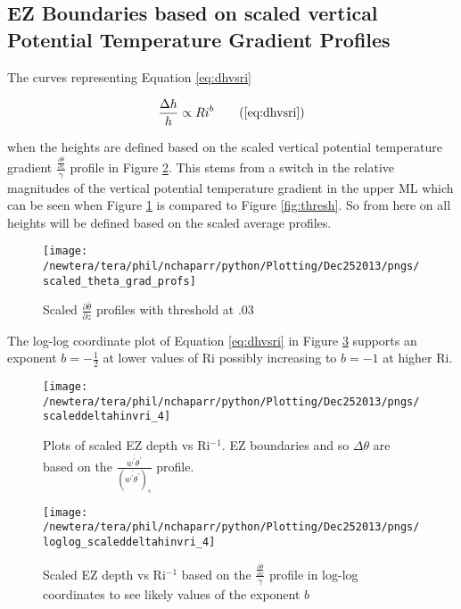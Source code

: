 \clearpage
\subsection{\acs{EZ} Boundaries based on scaled vertical Potential Temperature Gradient Profiles}
\label{subsec:ellimscaledprof}

The curves representing Equation \ref{eq:dhvsri} 

\begin{equation}
\frac{\Delta h}{h} \propto Ri ^{b} \tag{\ref{eq:dhvsri}}
\end{equation}

when the heights are defined based on the scaled vertical potential temperature gradient 
$\frac{\frac{\partial \overline{\theta}}{\partial z}}{\gamma}$ profile in Figure \ref{fig:deltahinvri_scaled}.  This stems
from a switch in the relative magnitudes of the vertical potential temperature gradient in the upper \acs{ML} which can be seen when Figure \ref{fig:thresh3} is compared to Figure \ref{fig:thresh}. So from here on all heights will be defined based on the scaled average profiles.   
\\

\begin{figure}[htbp]
    \centering
    \texttt{[image: /newtera/tera/phil/nchaparr/python/Plotting/Dec252013/pngs/scaled\_theta\_grad\_profs]}
    \caption{Scaled $\frac{\partial \overline{\theta}}{\partial z}$ profiles with threshold at .03}
    \label{fig:thresh3}   %
\end{figure}

The log-log coordinate plot of Equation \ref{eq:dhvsri} in Figure \ref{fig:loglogdeltahinvri} supports an exponent $b = -\frac{1}{2}$ at lower values of \acs{Ri} possibly increasing to $b = -1$ at higher \acs{Ri}.    

\clearpage

\begin{figure}[t]
    \centering
    \texttt{[image: /newtera/tera/phil/nchaparr/python/Plotting/Dec252013/pngs/scaleddeltahinvri\_4]}
    \caption[scaled \acs{EZ} depth vs \acs{Ri}$^{-1}$]{Plots of scaled \acs{EZ} depth vs \acs{Ri}$^{-1}$. \acs{EZ} boundaries and so $\Delta \theta$ are based on the $\frac{\overline{w^{'}\theta^{'}}}{(\overline{w^{'}\theta^{'}})_{s}}$ profile.}
    \label{fig:deltahinvri_scaled}   %
\end{figure}                      
\vspace{-50mm}
\begin{figure}[b]
\centering
\texttt{[image: /newtera/tera/phil/nchaparr/python/Plotting/Dec252013/pngs/loglog\_scaleddeltahinvri\_4]}\\
\caption[Log-log plot of scaled \acs{EZ} depth vs \acs{Ri}$^{-1}$]{Scaled \acs{EZ} depth vs \acs{Ri}$^{-1}$ based on the $\frac{\frac{\partial \overline{\theta}}{\partial z}}{\gamma}$ profile in log-log coordinates to see likely values of the exponent $b$}
\label{fig:loglogdeltahinvri}
\end{figure}

